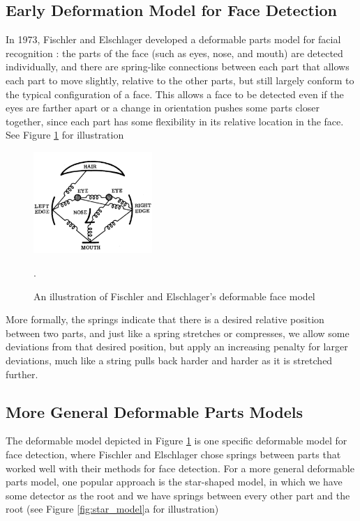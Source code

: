 \documentclass{article}
\begin{document}
\subsection{Early Deformation Model for Face Detection}

In 1973, Fischler and Elschlager developed a deformable parts model for facial 
recognition \cite{DPM}: the parts of the face (such as eyes, nose, and mouth) are detected 
individually, and there are spring-like connections between each part that allows
each part to move slightly, relative to the other parts, but still largely conform
to the typical configuration of a face. This allows a face to be detected even if
the eyes are farther apart or a change in orientation pushes some parts closer 
together, since each part has some flexibility in its relative location in the face.
See Figure \ref{fig:deformable_face} for illustration\\

\begin{figure}[h]
	\center
	\includegraphics[width=0.4\textwidth]{deformable_model.png}
    \caption{An illustration of Fischler and Elschlager's deformable face model\cite{DPM}}.
    \label{fig:deformable_face}
\end{figure}

More formally, the springs indicate that there is a desired relative position
between two parts, and just like a spring stretches or compresses, we allow some deviations from that desired position, but apply an increasing penalty for larger
deviations, much like a string pulls back harder and harder as it is stretched further.

\subsection{More General Deformable Parts Models}

The deformable model depicted in Figure \ref{fig:deformable_face} is one specific 
deformable model for face detection, where Fischler and
Elschlager chose springs between parts that worked well with their methods for face 
detection. For a more
general deformable parts model, one popular approach is the star-shaped model, in
which we have some detector as the root and we have springs between every other
part and the root (see Figure \ref{fig:star_model}a for illustration)
\end{document}
